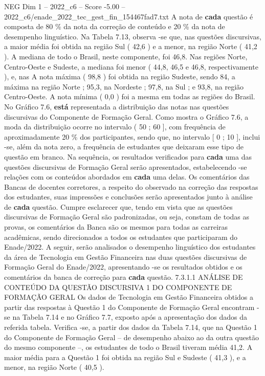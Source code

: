 \begin{textsample}{NEG Dim 1 – 2022\_c6 – Score -5.00 – 2022\_c6/enade\_2022\_tec\_gest\_fin\_154467fad7.txt}
A nota de \textbf{cada} questão é composta de 80 \% da nota da correção de conteúdo e 20 \% da nota de desempenho linguístico.
Na Tabela 7.13, observa -se que, nas questões discursivas, a maior média foi obtida na região Sul ( 42,6 ) e a menor, na região Norte ( 41,2 ).
A mediana de todo o Brasil, neste componente, foi 46,8.
Nas regiões Norte, Centro-Oeste e Sudeste, a mediana foi menor ( 44,8, 46,5 e 46,8, respectivamente ), e, nas A nota máxima ( 98,8 ) foi obtida na região Sudeste, sendo 84, a máxima na região Norte ; 95,3, na Nordeste ; 97,8, na Sul ; e 93,8, na região Centro-Oeste.
A nota mínima ( 0,0 ) foi a mesma em todas as regiões do Brasil.
No Gráfico 7.6, \textbf{está} representada a distribuição das notas nas questões discursivas do Componente de Formação Geral.
Como mostra o Gráfico 7.6, a moda da distribuição ocorre no intervalo ( 50 ; 60 ], com frequência de aproximadamente 20 \% dos participantes, sendo que, no intervalo [ 0 ; 10 ], inclui -se, além da nota zero, a frequência de estudantes que deixaram esse tipo de questão em branco.
Na sequência, os resultados verificados para \textbf{cada} uma das questões discursivas de Formação Geral serão apresentados, estabelecendo -se relações com os conteúdos abordados em \textbf{cada} uma delas.
Os comentários das Bancas de docentes corretores, a respeito do observado na correção das respostas dos estudantes, suas impressões e conclusões serão apresentados junto à análise de \textbf{cada} questão.
Cumpre esclarecer que, tendo em vista que as questões discursivas de Formação Geral são padronizadas, ou seja, constam de todas as provas, os comentários da Banca são os mesmos para todas as carreiras acadêmicas, sendo direcionados a todos os estudantes que participaram do Enade/2022.
A seguir, serão analisados o desempenho linguístico dos estudantes da área de Tecnologia em Gestão Financeira nas duas questões discursivas de Formação Geral do Enade/2022, apresentando -se os resultados obtidos e os comentários da banca de correção para \textbf{cada} questão. 7.3.1.1 ANÁLISE DE CONTEÚDO DA QUESTÃO DISCURSIVA 1 DO COMPONENTE DE FORMAÇÃO GERAL Os dados de Tecnologia em Gestão Financeira obtidos a partir das respostas à Questão 1 do Componente de Formação Geral encontram -se na Tabela 7.14 e no Gráfico 7.7, exposto após a apresentação dos dados da referida tabela.
Verifica -se, a partir dos dados da Tabela 7.14, que na Questão 1 do Componente de Formação Geral – de desempenho abaixo ao da outra questão do mesmo componente –, os estudantes de todo o Brasil tiveram média 41,2.
A maior média para a Questão 1 foi obtida na região Sul e Sudeste ( 41,3 ), e a menor, na região Norte ( 40,5 ).

\end{textsample}
